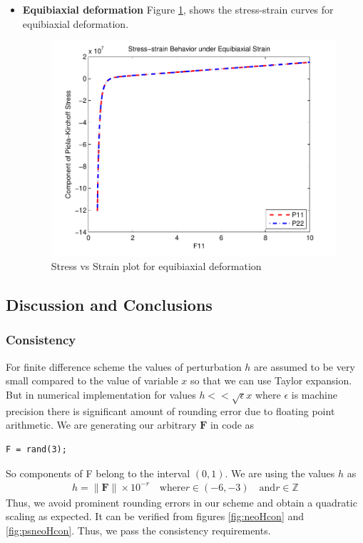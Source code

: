 \documentclass[../main.tex]{subfiles}
\begin{document}
\begin{itemize}
\item \textbf{Equibiaxial deformation}
Figure \ref{fig:equibiaxial}, shows the stress-strain curves for
equibiaxial deformation.
\begin{figure}[h]
  \centering
  \includegraphics{./img/EquiBiaxial_1.pdf}
  \caption{Stress vs Strain plot for equibiaxial deformation}
  \label{fig:equibiaxial}
\end{figure}
\end{itemize}

\subsection{Discussion and Conclusions}
\subsubsection{Consistency}
For finite difference scheme the values of perturbation $h$ are
assumed to be very small compared to the value of variable $x$ so that
we can use Taylor expansion. But in numerical implementation for
values $h << \sqrt{\epsilon}x$ where $\epsilon$ is machine precision
there is significant amount of rounding error due to floating point
arithmetic. We are generating our arbitrary $\mathbf{F}$ in code as
\begin{lstlisting}[frame=single]
  F = rand(3);
\end{lstlisting}
So components of F belong to the interval $(0,1)$. We are using the
values $h$ as
\begin{align*}
  h = \lVert\mathbf{F}\rVert\times10^{-r}\quad\text{where} r\in(-6,-3)\quad \text{and} r\in\mathbb{Z}
\end{align*}
Thus, we avoid prominent rounding errors in our scheme and obtain a
quadratic scaling as expected. It can be verified from figures
\ref{fig:neoHcon} and \ref{fig:psneoHcon}. Thus, we pass the
consistency requirements.
\end{document}
